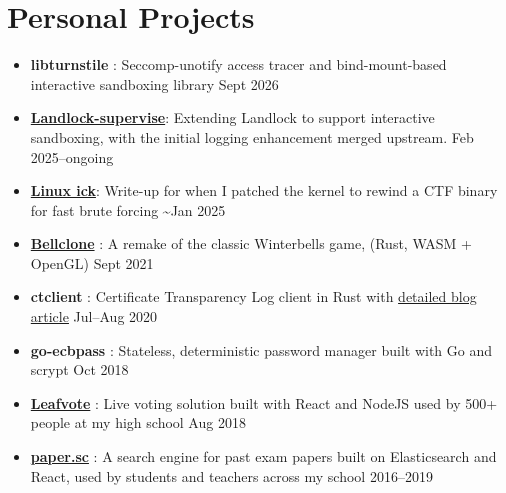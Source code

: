   \section{Personal Projects}

  \begin{itemize}
    \item \textbf{libturnstile} : Seccomp-unotify access tracer and bind-mount-based interactive sandboxing library \dashdiv{} Sept 2026

    \item \href{https://mww.moe/llmut}{\textbf{\color{link}Landlock-supervise}}: Extending Landlock to support interactive sandboxing, with the initial logging enhancement merged upstream. \dashdiv{} Feb 2025--ongoing

    \item \href{https://blog.maowtm.org/linux-ick/en.html}{\textbf{\color{link}Linux ick}}: Write-up for when I patched the kernel to rewind a CTF binary for fast brute forcing \dashdiv{} \textasciitilde{}Jan 2025



    \item \href{https://bellclone.maowtm.org/}{\color{link}\textbf{Bellclone}} : A remake of the classic Winterbells game, (Rust, WASM + OpenGL) \dashdiv{} Sept 2021

    \item \textbf{ctclient} : Certificate Transparency Log client in Rust with \href{https://blog.maowtm.org/ct/en.html}{\color{link}detailed blog article} \dashdiv{} Jul--Aug 2020

    \item \textbf{go-ecbpass} : Stateless, deterministic password manager built with Go and scrypt \dashdiv{} Oct 2018

    \item \href{https://leafvote.mww.moe}{\color{link}\textbf{Leafvote}} : Live voting solution built with React and NodeJS used by 500+ people at my high school \dashdiv{} Aug 2018

    \item \href{https://paper.sc}{\color{link}\textbf{paper.sc}} : A search engine for past exam papers built on Elasticsearch and React, used by students and teachers across my school \dashdiv{} 2016--2019
  \end{itemize}



